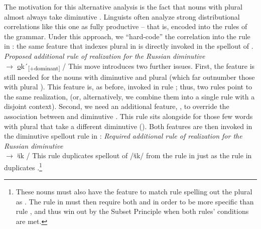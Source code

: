 \documentclass[output=paper,colorlinks,citecolor=brown
]{langscibook}
\begin{document}
The motivation for this alternative analysis is the fact that nouns with plural \pla{} almost always take diminutive \ok. Linguists often analyze strong distributional correlations like this one as fully productive -- that is, encoded into the rules of the grammar. Under this approach, we ``hard-code'' the correlation into the rule in : the same  feature that indexes plural \pla{} in  is directly invoked in the spellout of \ok{}.
\ea\label{ex:okavia} \emph{Proposed additional rule of realization for the Russian diminutive}\\
    \DIM{} $\rightarrow$ \underline{o}k´\textsubscript{[$+$dominant]} / \gap
\z
This move introduces two further issues. First, the  feature is still needed for the nouns with diminutive \ok{} and plural \pli{} (which far outnumber those with plural \pla). This feature is, as before, invoked in rule ; thus, two rules point to the same realization,  (or, alternatively, we combine them into a single rule with a disjoint context).
Second, we need an additional feature, , to override the association between  and diminutive \ok{}. This rule sits alongside  for those few words with plural \pla{} that take a different diminutive (\ik). Both features are then invoked in the diminutive spellout rule in :
\ea\label{ex:ikavia} \emph{Required additional rule of realization for the Russian diminutive}\\
    \DIM{} $\rightarrow$ ʲik / \gap
\z
This rule duplicates spellout of /ʲik/ from the rule in  just as the rule in  duplicates .\footnote{These nouns must also have the  feature to match rule  spelling out the plural as \pla. The rule in  must then require both  and  in order to be more specific than rule , and thus win out by the Subset Principle \citep{Halle1997b} when both rules' conditions are met.}
\end{document}
